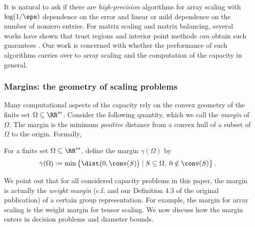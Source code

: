 It is natural to ask if there are \emph{high-precision} algorithms for array scaling with $\log(1/\eps)$ dependence on the error and linear or mild dependence on the number of nonzero entries. For matrix scaling and matrix balancing, several works have shown that trust regions and interior point methods \emph{can} obtain such guarantees \cite{cohen2017matrix,allen2017much}.
Our work is concerned with whether the performance of such algorithms carries over to array scaling and the computation of the capacity in general.





































\setcounter{thm}{1}\subsubsection{Margins: the geometry of scaling problems}
Many computational aspects of the capacity rely on the convex geometry of the finite set $\Omega \subseteq \RR^m$. Consider the following quantity, which we call the \emph{margin} of $\Omega$. 
The margin is the minimum \emph{positive} distance from a convex hull of a subset of $\Omega$ to the origin. Formally,
\begin{dfn}[Margin]\label{dfn:margin} For a finite set $\Omega \subseteq \RR^m$, define the margin $\gamma(\Omega)$ by
	\[ \gamma(\Omega) := \min \left\lbrace \dist \big(0, \conv(S) \big) \mid S \subseteq \Omega, \; 0 \notin \conv(S) \right\rbrace.\]
\end{dfn}
We point out that for all considered capacity problems in this paper, the margin is actually the \emph{weight margin} (c.f. \cite{gradflow} and our Definition 4.3 of the original publication) of a certain group representation. For example, the margin for array scaling is the weight margin for tensor scaling. 
We now discuss how the margin enters in decision problems and diameter bounds.


